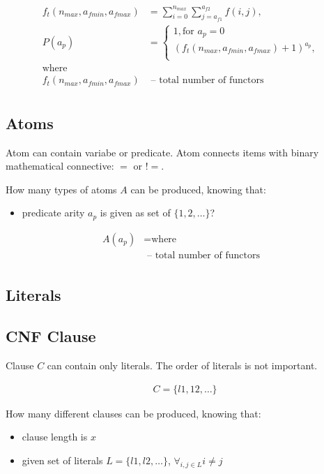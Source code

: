 \begin{align*}
	f_t(n_{max}, a_{fmin}, a_{fmax}) &= \sum_{i=0}^{n_{max}} \sum_{j=a_{f1}}^{a_{f2}} f(i, j), \\
	P(a_p) &=
	\begin{cases}
		1, \text{for } a_p = 0 \\
		(f_t(n_{max}, a_{fmin}, a_{fmax}) + 1)^{a_p}, \\
	\end{cases} \\
	\text{where} \\
	f_t(n_{max}, a_{fmin}, a_{fmax}) & \text{ -- total number of functors} \\
\end{align*}

\subsection{Atoms}

Atom can contain variabe or predicate. Atom connects items with binary mathematical connective: $=$ or $!=$.

How many types of atoms $A$ can be produced, knowing that:
\begin{itemize}
	\item predicate arity $a_p$ is given as set of $\{1,2,\dots\}$?
\end{itemize}

\begin{align*}
	A(a_p) &=
	\text{where} \\
	& \text{ -- total number of functors} \\
\end{align*}

\subsection{Literals}

\subsection{CNF Clause}

Clause $C$ can contain only literals. The order of literals is not important.

\begin{align*}
	&C = \{l1, 12, \dots\}
\end{align*}

How many different clauses can be produced, knowing that:
\begin{itemize}
	\item clause length is $x$
	\item given set of literals $L = \{l1, l2, \dots\}$, $\forall_{i,j \in L} i \neq j$
\end{itemize}


